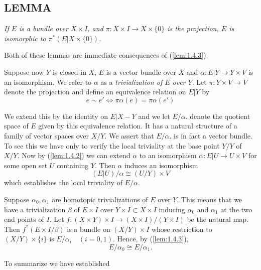 \subsection{LEMMA} \textit{If $E$ is a bundle over $X \times I$, and $\pi: X \times I \to X \times \{0\}$ is the projection, $E$ is isomorphic to $\pi^*(E \vert X \times \{0\})$.} \par 

Both of these lemmas are immediate consequences of (\ref{lem:1.4.3}). \par \hfill

Suppose now $Y$ is closed in $X$, $E$ is a vector bundle over $X$ and $\alpha: E \vert Y \to Y \times V$ is an isomorphism. We refer to $\alpha$ as a \textit{trivialization of $E$ over $Y$}. Let $\pi: Y \times V \to V$ denote the projection and define an equivalence relation on $E \vert Y$ by
\begin{equation}
    e \sim e' \iff \pi \alpha (e) = \pi \alpha (e')
\end{equation}

We extend this by the identity on $E \vert X - Y$ and we let $E/\alpha$. denote the quotient space of $E$ given by this equivalence relation. It has a natural structure of a family of vector spaces over $X/Y$. We assert that $E/\alpha$. is in fact a vector bundle. To see this we have only to verify the local triviality at the base point $Y/Y$ of $X/Y$. Now by (\ref{lem:1.4.2}) we can extend $\alpha$ to an isomorphism $\alpha: E \vert U \to U \times V$ for some open set $U$ containing $Y$. Then $\alpha$ induces an isomorphism
\begin{equation}
    (E \vert U) / \alpha \cong (U/Y) \times V
\end{equation}
which establishes the local triviality of $E/\alpha$. \par

Suppose $\alpha_0, \alpha_1$ are homotopic trivializations of $E$ over $Y$. This means that we have a trivialization $\beta$ of $E \times I$ over $Y \times I \subset X \times I$ inducing $\alpha_0$ and $\alpha_1$ at the two end points of $I$. Let $f: (X \times Y) \times I \to (X \times I)/(Y \times I)$ be the natural map. Then $f^*(E \times I/\beta)$ is a bundle on $(X/Y) \times I$ whose restriction to $(X/Y) \times \{i\}$ is $E/\alpha_i \quad (i = 0, 1)$. Hence, by (\ref{lem:1.4.3}),
\begin{equation}
    E/\alpha_0 \cong  E/\alpha_1.
\end{equation}

To summarize we have established \par

